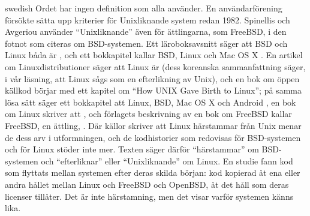 \begin{onlyin}{swedish}
Ordet har ingen definition som alla använder.
En användarförening försökte sätta upp kriterier för Unixliknande system
redan 1982\autocite{Mason1982Criteria}.
Spinellis och Avgeriou använder \enquote{Unixliknande} även för
ättlingarna, som FreeBSD, i den fotnot som citeras om BSD-systemen.
Ett läroboksavsnitt säger att BSD och Linux båda är
,
och ett bokkapitel kallar BSD, Linux och Mac OS X
.
En artikel om Linuxdistributioner säger att Linux är
 (dess koreanska sammanfattning säger, i vår
läsning, att Linux sågs som en efterlikning av Unix), och en bok om
öppen källkod börjar med ett kapitel om \enquote{How UNIX Gave Birth to
Linux}\autocite{Meeker2008OpenSource}; på samma lösa sätt säger ett
bokkapitel att Linux, BSD, Mac OS X och Android
,
en bok om Linux skriver att
, och
förlagets beskrivning av en bok om FreeBSD kallar FreeBSD, en ättling,
.
Där källor skriver att Linux härstammar från Unix menar de dess arv i
utformningen, och de kodhistorier som redovisas för BSD-systemen och
för Linux stöder inte mer.
Texten säger därför \enquote{härstammar} om BSD-systemen och
\enquote{efterliknar} eller \enquote{Unixliknande} om Linux.
En studie fann kod som flyttats mellan systemen efter deras skilda
början: kod kopierad åt ena eller andra hållet mellan Linux och FreeBSD
och OpenBSD, åt det håll som deras licenser
tillåter\autocite{German2009Siblings}.
Det är inte härstamning, men det visar varför systemen känns lika.
\end{onlyin}

